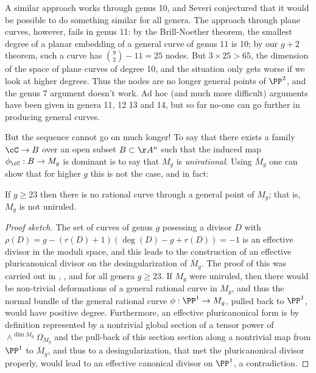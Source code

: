 A similar approach works through genus 10, and Severi conjectured that it would be possible to do something similar for all genera. The approach through plane curves, however, fails in genus 11: by the Brill-Noether theorem, the smallest degree of a planar embedding of a general curve of genus 11 is 10; by our $g+2$ theorem, such a curve has ${9\choose 2}-11 = 25$ nodes. But $3 \times 25 > 65$, the dimension of the space of plane curves of degree 10, and the situation only gets worse if we look at higher degrees. Thus the nodes are no longer general points of $\PP^2$, and the genus 7 argument doesn't work. 
 Ad hoc (and much more difficult) arguments have been given in genera 11, 12 13 and 14, but so far no-one can go further in producing general curves. 

But the sequence cannot go on much longer! To say that there exists a family $\cC \to B$ over an open subset $B \subset \AA^n$ such that the induced map $\phi_\cC : B \to M_g$ is dominant is to say that $M_g$ is \emph{unirational}. Using $\overline M_g$ one can show that for higher $g$ this is not the case, and in fact:

\begin{theorem}
If $g\geq 23$ then there is no rational curve through a general point of $M_g$; that is, $M_g$ is not uniruled.
\end{theorem}
\begin{proof}[Proof sketch]
The set of curves of genus $g$ posessing a divisor $D$ with $\rho(D) = g - (r(D)+1)(\deg(D) -g + r(D)) = -1$ is an effective divisor
in the moduli space, and this leads to the construction of an effective pluricanonical divisor on the desingularization of $\overline M_g$. The proof of this
was carried out in
\cite{Harris-Mumford-Moduli}, \cite{HarrisModuli}, and \cite{Eisenbud-HarrisModuli}
 for all genera $g \geq 23$.
If $M_g$ were uniruled, then there would be non-trivial deformations of a general rational curve in $M_g$, 
and thus the normal bundle of the general rational curve $\phi: \PP^1 \to M_g$, pulled back to $\PP^1$, would have positive degree. 
Furthermore, an effective pluricanonical form is by definition represented by a nontrivial global section of a tensor power
of $\wedge^{\dim M_g}\Omega_{M_g}$ and the pull-back of this section section 
along a nontrivial map from $\PP^1$ to $\overline M_g$, and thus to a desingularization, that met the pluricanonical divisor properly, would lead to an effective canonical divisor on $\PP^1$, a contradiction.
\end{proof}
 

